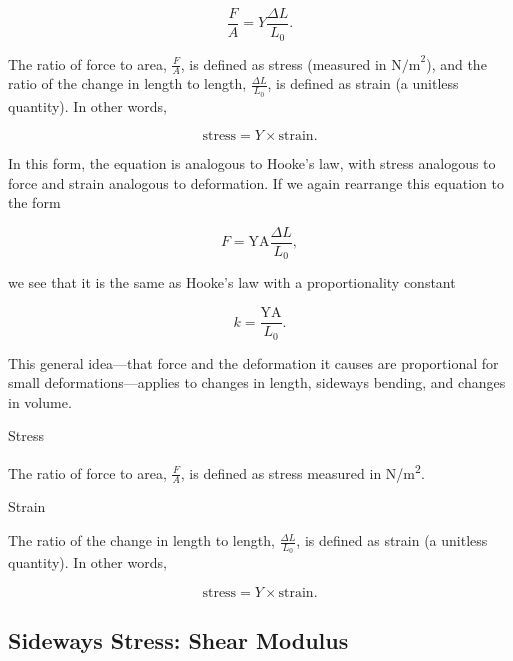 \documentclass[
]{book}
\newenvironment{note}{}{}
\begin{document}
\leavevmode\hypertarget{eip-725}{}%
\[{{\frac{F}{A} = Y}\frac{\Delta L}{L_{0}}}.{}\]

The ratio of force to area, \emph{\(\frac{F}{A}{}\)}, is defined as
\protect\hypertarget{import-auto-id1165298867113}{}{stress} (measured in
\(\text{N/m}^{\text{2}}\)), and the ratio of the change in length to
length, \(\frac{\Delta L}{L_{0}}{}\), is defined as
\protect\hypertarget{import-auto-id1165298883978}{}{strain} (a unitless
quantity). In other words,

\leavevmode\hypertarget{eip-760}{}%
\[{\text{stress} = {Y \times \text{strain}}.}{}\]

In this form, the equation is analogous to Hooke's law, with stress
analogous to force and strain analogous to deformation. If we again
rearrange this equation to the form

\leavevmode\hypertarget{eip-77}{}%
\[{{{F = \text{YA}}\frac{\Delta L}{L_{0}}},}{}\]

we see that it is the same as Hooke's law with a proportionality
constant

\leavevmode\hypertarget{eip-903}{}%
\[{{k = \frac{\text{YA}}{L_{0}}}.}{}\]

This general idea---that force and the deformation it causes are
proportional for small deformations---applies to changes in length,
sideways bending, and changes in volume.

\hypertarget{fs-id1165296614220}{}
\begin{note}

Stress

The ratio of force to area, \emph{\(\frac{F}{A}{}\)}, is defined as stress
measured in N/m\textsuperscript{2}.

\end{note}

\hypertarget{fs-id1165298937224}{}
\begin{note}

Strain

The ratio of the change in length to length, \(\frac{\Delta L}{L_{0}}{}\),
is defined as strain (a unitless quantity). In other words,

\leavevmode\hypertarget{eip-282}{}%
\[{\text{stress} = {Y \times \text{strain}}.}{}\]

\end{note}

\hypertarget{fs-id1165298648094}{}
\hypertarget{sideways-stress-shear-modulus}{%
\subsection{Sideways Stress: Shear Modulus}\label{sideways-stress-shear-modulus}}
\end{document}
